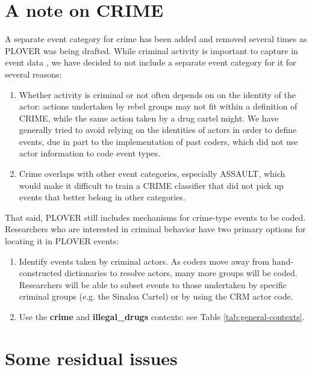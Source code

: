 \documentclass[11pt]{report}
\newcommand{\plcat}[1]{\textsf{#1}}
\newcommand{\plcon}[1]{\textbf{#1}}
\begin{document}
{\section{A note on \plcat{CRIME}}

A separate event category for crime has been added and removed several times as PLOVER was being drafted. While criminal activity is important to capture in event data \citep{osorio2015contagion, osorio2017supervised}, we have decided to not include a separate event category for it for several reasons:

\begin{enumerate}

	\item Whether activity is criminal or not often depends on on the identity of the actor: actions undertaken by rebel groups may not fit within a definition of \plcat{CRIME}, while the same action taken by a drug cartel might. We have generally tried to avoid relying on the identities of actors in order to define events, due in part to the implementation of past coders, which did not use actor information to code event types.

	\item Crime overlaps with other event categories, especially \plcat{ASSAULT}, which would make it difficult to train a \plcat{CRIME} classifier that did not pick up events that better belong in other categories.
\end{enumerate}


\noindent That said, PLOVER still includes mechanisms for crime-type events to be coded. Researchers who are interested in criminal behavior have two primary options for locating it in PLOVER events:

\begin{enumerate}
	\item Identify events taken by criminal actors. As coders move away from hand-constructed dictionaries to resolve actors, many more groups will be coded. Researchers will be able to subset events to those undertaken by specific criminal groups (e.g. the Sinaloa Cartel) or by using the CRM actor code.
	
	\item Use the \plcon{crime} and \plcon{illegal\_drugs} contexts: see Table \ref{tab:general-contexts}.
\end{enumerate}


\section{Some residual issues}\label{sec:nothing}

}
\end{document}
